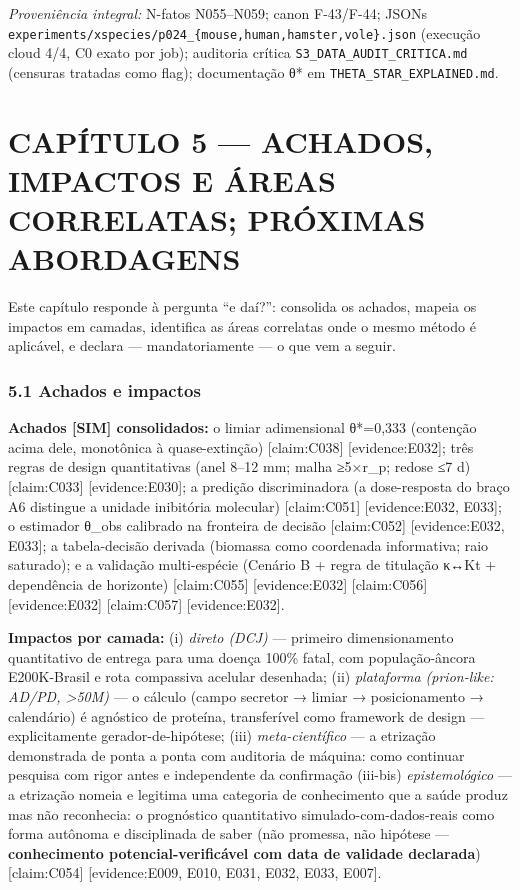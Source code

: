 \documentclass[
  12pt,
]{report}
\begin{document}
\emph{Proveniência integral:} N-fatos N055--N059; canon F-43/F-44; JSONs
\texttt{experiments/xspecies/p024\_\{mouse,human,hamster,vole\}.json}
(execução cloud 4/4, C0 exato por job); auditoria crítica
\texttt{S3\_DATA\_AUDIT\_CRITICA.md} (censuras tratadas como flag);
documentação θ* em \texttt{THETA\_STAR\_EXPLAINED.md}.

\hypertarget{capuxedtulo-5-achados-impactos-e-uxe1reas-correlatas-pruxf3ximas-abordagens}{%
\chapter{CAPÍTULO 5 --- ACHADOS, IMPACTOS E ÁREAS CORRELATAS; PRÓXIMAS
ABORDAGENS}\label{capuxedtulo-5-achados-impactos-e-uxe1reas-correlatas-pruxf3ximas-abordagens}}

Este capítulo responde à pergunta ``e daí?'': consolida os achados,
mapeia os impactos em camadas, identifica as áreas correlatas onde o
mesmo método é aplicável, e declara --- mandatoriamente --- o que vem a
seguir.

\hypertarget{achados-e-impactos}{%
\subsection{5.1 Achados e impactos}\label{achados-e-impactos}}

\textbf{Achados {[}SIM{]} consolidados:} o limiar adimensional θ*=0,333
(contenção acima dele, monotônica à quase-extinção) {[}claim:C038{]}
{[}evidence:E032{]}; três regras de design quantitativas (anel 8--12 mm;
malha ≥5×r\_p; redose ≤7 d) {[}claim:C033{]} {[}evidence:E030{]}; a
predição discriminadora (a dose-resposta do braço A6 distingue a unidade
inibitória molecular) {[}claim:C051{]} {[}evidence:E032, E033{]}; o
estimador θ\_obs calibrado na fronteira de decisão {[}claim:C052{]}
{[}evidence:E032, E033{]}; a tabela-decisão derivada (biomassa como
coordenada informativa; raio saturado); e a validação multi-espécie
(Cenário B + regra de titulação κ↔Kt + dependência de horizonte)
{[}claim:C055{]} {[}evidence:E032{]} {[}claim:C056{]}
{[}evidence:E032{]} {[}claim:C057{]} {[}evidence:E032{]}.

\textbf{Impactos por camada:} (i) \emph{direto (DCJ)} --- primeiro
dimensionamento quantitativo de entrega para uma doença 100\% fatal, com
população-âncora E200K-Brasil e rota compassiva acelular desenhada; (ii)
\emph{plataforma (prion-like: AD/PD, \textgreater50M)} --- o cálculo
(campo secretor → limiar → posicionamento → calendário) é agnóstico de
proteína, transferível como framework de design --- explicitamente
gerador-de-hipótese; (iii) \emph{meta-científico} --- a etrização
demonstrada de ponta a ponta com auditoria de máquina: como continuar
pesquisa com rigor antes e independente da confirmação (iii-bis)
\emph{epistemológico} --- a etrização nomeia e legitima uma categoria de
conhecimento que a saúde produz mas não reconhecia: o prognóstico
quantitativo simulado-com-dados-reais como forma autônoma e disciplinada
de saber (não promessa, não hipótese --- \textbf{conhecimento
potencial-verificável com data de validade declarada}) {[}claim:C054{]}
{[}evidence:E009, E010, E031, E032, E033, E007{]}.
\end{document}
